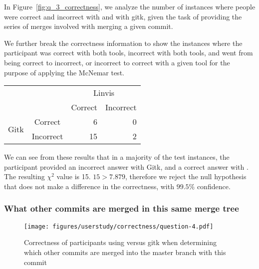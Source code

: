 In Figure~\ref{fig:q_3_correctness}, we analyze the number of instances
where people were correct and incorrect with \tool and with gitk, given
the task of providing the series of merges involved with merging a given
commit.





We further break the correctness information to show the instances where
the participant was correct with both tools, incorrect with both tools,
and went from being correct to incorrect, or incorrect to correct with a
given tool for the purpose of applying the McNemar test.

\begin{center}
  \begin{tabular}{cc|rr}
                           &           & \multicolumn{2}{c}{Linvis}\\
                           &           & Correct                      & Incorrect\\\hline
    \multirow{2}{*}{Gitk}  & Correct   & 6                            & 0\\
                           & Incorrect & 15                           & 2\\
  \end{tabular}
\end{center}

We can see from these results that in a majority of the test instances,
the participant provided an incorrect answer with Gitk, and a correct
answer with \tool. The resulting $\chi^2$ value is 15. $15 > 7.879$,
therefore we reject the null hypothesis that \tool does not make a
difference in the correctness, with $99.5\%$ confidence.

\subsubsection{What other commits are merged in this same merge tree}
\label{ssub:what_other_commits_are_merged_in_this_same_merge_tree}

\begin{figure}[htpb]
  \centering
  \texttt{[image: figures/userstudy/correctness/question-4.pdf]}
  \caption{Correctness of participants using \tool versus gitk when
    determining which other commits are merged into the master branch
    with this commit}
  \label{fig:q_4_correctness}
\end{figure}

